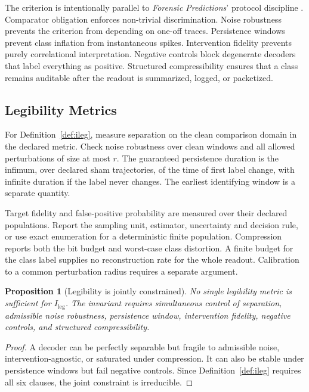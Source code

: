 \documentclass[11pt,a4paper]{article}
\newtheorem{proposition}[theorem]{Proposition}
\theoremstyle{definition}
\newcommand{\Ileg}{I_{\mathrm{leg}}}
\begin{document}
The criterion is intentionally parallel to \textit{Forensic Predictions}' protocol discipline \cite{paper4}. Comparator obligation enforces non-trivial discrimination. Noise robustness prevents the criterion from depending on one-off traces. Persistence windows prevent class inflation from instantaneous spikes. Intervention fidelity prevents purely correlational interpretation. Negative controls block degenerate decoders that label everything as positive. Structured compressibility ensures that a class remains auditable after the readout is summarized, logged, or packetized.

\subsection{Legibility Metrics}
For Definition~\ref{def:ileg}, measure separation on the clean comparison domain in the declared metric. Check noise robustness over clean windows and all allowed perturbations of size at most $r$. The guaranteed persistence duration is the infimum, over declared sham trajectories, of the time of first label change, with infinite duration if the label never changes. The earliest identifying window is a separate quantity.

Target fidelity and false-positive probability are measured over their declared populations. Report the sampling unit, estimator, uncertainty and decision rule, or use exact enumeration for a deterministic finite population. Compression reports both the bit budget and worst-case class distortion. A finite budget for the class label supplies no reconstruction rate for the whole readout. Calibration to a common perturbation radius requires a separate argument.

\begin{proposition}[Legibility is jointly constrained]\label{prop:legibility}
No single legibility metric is sufficient for $\Ileg$. The invariant requires simultaneous control of separation, admissible noise robustness, persistence window, intervention fidelity, negative controls, and structured compressibility.
\end{proposition}

\begin{proof}
A decoder can be perfectly separable but fragile to admissible noise, intervention-agnostic, or saturated under compression. It can also be stable under persistence windows but fail negative controls. Since Definition~\ref{def:ileg} requires all six clauses, the joint constraint is irreducible.
\end{proof}
\end{document}
